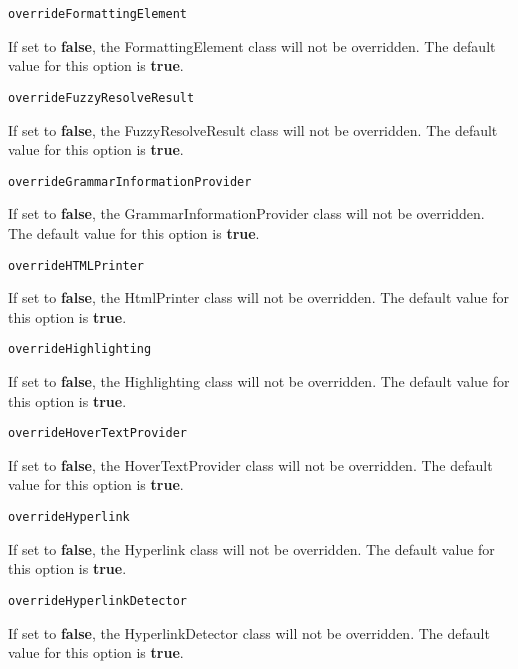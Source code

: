 \noindent\texttt{overrideFormattingElement}
\begin{myindentpar}{1cm}
If set to \textbf{false}, the FormattingElement class will not be overridden. The default value for this option is \textbf{true}.
\end{myindentpar}

\noindent\texttt{overrideFuzzyResolveResult}
\begin{myindentpar}{1cm}
If set to \textbf{false}, the FuzzyResolveResult class will not be overridden. The default value for this option is \textbf{true}.
\end{myindentpar}

\noindent\texttt{overrideGrammarInformationProvider}
\begin{myindentpar}{1cm}
If set to \textbf{false}, the GrammarInformationProvider class will not be overridden. The default value for this option is \textbf{true}.
\end{myindentpar}

\noindent\texttt{overrideHTMLPrinter}
\begin{myindentpar}{1cm}
If set to \textbf{false}, the HtmlPrinter class will not be overridden. The default value for this option is \textbf{true}.
\end{myindentpar}

\noindent\texttt{overrideHighlighting}
\begin{myindentpar}{1cm}
If set to \textbf{false}, the Highlighting class will not be overridden. The default value for this option is \textbf{true}.
\end{myindentpar}

\noindent\texttt{overrideHoverTextProvider}
\begin{myindentpar}{1cm}
If set to \textbf{false}, the HoverTextProvider class will not be overridden. The default value for this option is \textbf{true}.
\end{myindentpar}

\noindent\texttt{overrideHyperlink}
\begin{myindentpar}{1cm}
If set to \textbf{false}, the Hyperlink class will not be overridden. The default value for this option is \textbf{true}.
\end{myindentpar}

\noindent\texttt{overrideHyperlinkDetector}
\begin{myindentpar}{1cm}
If set to \textbf{false}, the HyperlinkDetector class will not be overridden. The default value for this option is \textbf{true}.
\end{myindentpar}

